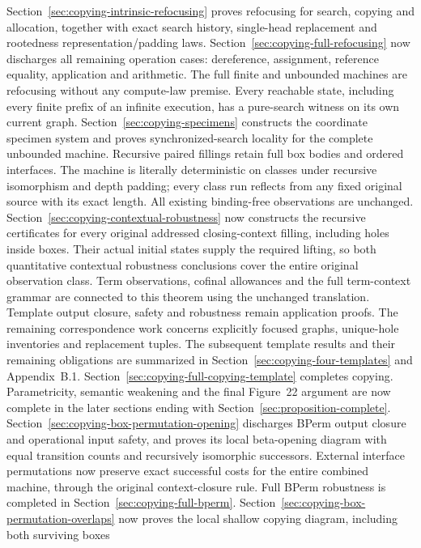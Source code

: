 \begin{enumerate}
Section~\ref{sec:copying-intrinsic-refocusing} proves refocusing for search,
copying and allocation, together with exact search history, single-head
replacement and rootedness representation/padding laws.
Section~\ref{sec:copying-full-refocusing} now discharges all remaining
operation cases: dereference, assignment, reference equality, application and
arithmetic. The full finite and unbounded machines are refocusing without any
compute-law premise. Every reachable state, including every finite prefix of
an infinite execution, has a pure-search witness on its own current graph.
Section~\ref{sec:copying-specimens} constructs the coordinate specimen system
and proves synchronized-search locality for the complete unbounded machine.
Recursive paired fillings retain full box bodies and ordered interfaces.
The machine is literally deterministic on classes under recursive isomorphism
and depth padding; every class run reflects from any fixed original source
with its exact length. All existing binding-free observations are unchanged.
Section~\ref{sec:copying-contextual-robustness} now constructs the recursive
certificates for every original addressed closing-context filling, including
holes inside boxes. Their actual initial states supply the required lifting,
so both quantitative contextual robustness conclusions cover the entire
original observation class. Term observations, cofinal allowances and the
full term-context grammar are connected to this theorem using the unchanged
translation. Template output closure, safety and robustness remain application
proofs. The remaining correspondence work concerns explicitly focused graphs,
unique-hole inventories and replacement tuples. The subsequent template results and their remaining obligations are summarized in
Section~\ref{sec:copying-four-templates} and Appendix~B.1. Section~\ref{sec:copying-full-copying-template} completes copying. Parametricity,
semantic weakening and the final Figure~22 argument are now complete in the
later sections ending with Section~\ref{sec:proposition-complete}.
Section~\ref{sec:copying-box-permutation-opening} discharges BPerm output
closure and operational input safety, and proves its local beta-opening diagram
with equal transition counts and recursively isomorphic successors. External
interface permutations now preserve exact successful costs for the entire
combined machine, through the original context-closure rule. Full BPerm robustness is completed in Section~\ref{sec:copying-full-bperm}. Section~\ref{sec:copying-box-permutation-overlaps}
now proves the local shallow copying diagram, including both surviving boxes

\end{enumerate}
